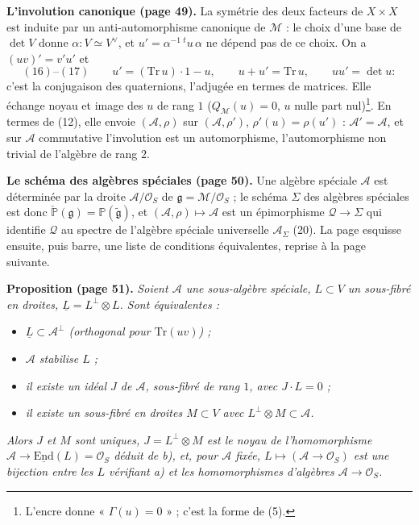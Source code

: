 \documentclass[11pt,a4paper]{article}
\begin{document}
\textbf{L'involution canonique (page 49).} La symétrie des deux facteurs de
$X \times X$ est induite par un anti-automorphisme canonique de $\mathcal{M}$ : le choix
d'une base de $\det V$ donne $\alpha : V \simeq V^{\vee}$, et
$u' = \alpha^{-1}\,{}^{t}u\,\alpha$ ne dépend pas de ce choix. On a $(uv)' = v'u'$ et
\[
  (16)\text{--}(17) \qquad u' = (\mathrm{Tr}\,u)\cdot 1 - u , \qquad u + u' = \mathrm{Tr}\,u , \qquad uu' = \det u :
\]
c'est la conjugaison des quaternions, l'adjugée en termes de matrices. Elle
échange noyau et image des $u$ de rang $1$ ($Q_{\mathcal{M}}(u) = 0$, $u$ nulle part
nul)\footnote{L'encre donne « $\Gamma(u) = 0$ » ; c'est la forme de (5).}. En termes
de (12), elle envoie $(\mathcal{A}, \rho)$ sur $(\mathcal{A}, \rho')$, $\rho'(u) = \rho(u')$ :
$\mathcal{A}' = \mathcal{A}$, et sur $\mathcal{A}$ commutative l'involution est un
automorphisme, l'automorphisme non trivial de l'algèbre de rang $2$.

\textbf{Le schéma des algèbres spéciales (page 50).} Une algèbre spéciale
$\mathcal{A}$ est déterminée par la droite $\mathcal{A}/\mathcal{O}_S$ de $\mathfrak{g} = \mathcal{M}/\mathcal{O}_S$ ;
le schéma $\Sigma$ des algèbres spéciales est donc $\check{\mathbb{P}}(\mathfrak{g}) =
\mathbb{P}(\widetilde{\mathfrak{g}})$, et $(\mathcal{A}, \rho) \mapsto \mathcal{A}$ est un épimorphisme
$\mathcal{Q} \to \Sigma$ qui identifie $\mathcal{Q}$ au spectre de l'algèbre spéciale universelle
$\mathcal{A}_{\Sigma}$ (20). La page esquisse ensuite, puis barre, une liste de
conditions équivalentes, reprise à la page suivante.

\textbf{Proposition (page 51).} \emph{Soient $\mathcal{A}$ une sous-algèbre spéciale,
$L \subset V$ un sous-fibré en droites, $\underline{L} = L^{\perp} \otimes L$. Sont
équivalentes :}
\begin{itemize}
  \item[a)] \emph{$\underline{L} \subset \mathcal{A}^{\perp}$ (orthogonal pour
    $\mathrm{Tr}(uv)$) ;}
  \item[b)] \emph{$\mathcal{A}$ stabilise $L$ ;}
  \item[c)] \emph{il existe un idéal $J$ de $\mathcal{A}$, sous-fibré de rang $1$, avec
    $J \cdot L = 0$ ;}
  \item[d)] \emph{il existe un sous-fibré en droites $M \subset V$ avec
    $L^{\perp} \otimes M \subset \mathcal{A}$.}
\end{itemize}
\emph{Alors $J$ et $M$ sont uniques, $J = L^{\perp} \otimes M$ est le noyau de
l'homomorphisme $\mathcal{A} \to \underline{\mathrm{End}}(L) = \mathcal{O}_S$ déduit de b), et,
pour $\mathcal{A}$ fixée, $L \mapsto (\mathcal{A} \to \mathcal{O}_S)$ est une bijection entre les $L$
vérifiant a) et les homomorphismes d'algèbres $\mathcal{A} \to \mathcal{O}_S$.}
\end{document}
